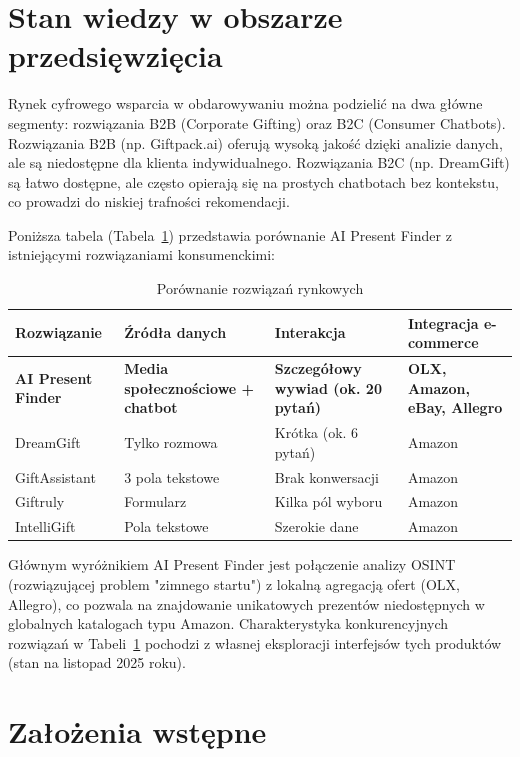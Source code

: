 \documentclass[12pt,a4paper]{article}
\begin{document}
\section{Stan wiedzy w obszarze przedsięwzięcia}

Rynek cyfrowego wsparcia w obdarowywaniu można podzielić na dwa główne segmenty: rozwiązania B2B (Corporate Gifting) oraz B2C (Consumer Chatbots). Rozwiązania B2B (np. Giftpack.ai) oferują wysoką jakość dzięki analizie danych, ale są niedostępne dla klienta indywidualnego. Rozwiązania B2C (np. DreamGift) są łatwo dostępne, ale często opierają się na prostych chatbotach bez kontekstu, co prowadzi do niskiej trafności rekomendacji.

Poniższa tabela (Tabela~\ref{tab:market-comparison}) przedstawia porównanie AI Present Finder z istniejącymi rozwiązaniami konsumenckimi:

\begin{table}[h]
\centering
\begin{tabular}{|p{}|p{}|p{}|p{}|}
\hline
\textbf{Rozwiązanie} & \textbf{Źródła danych} & \textbf{Interakcja} & \textbf{Integracja e-commerce} \\
\hline
\textbf{AI Present Finder} & \textbf{Media społecznościowe + chatbot} & \textbf{Szczegółowy wywiad (ok. 20 pytań)} & \textbf{OLX, Amazon, eBay, Allegro} \\
\hline
DreamGift & Tylko rozmowa & Krótka (ok. 6 pytań) & Amazon \\
\hline
GiftAssistant & 3 pola tekstowe & Brak konwersacji & Amazon \\
\hline
Giftruly & Formularz & Kilka pól wyboru & Amazon \\
\hline
IntelliGift & Pola tekstowe & Szerokie dane & Amazon \\
\hline
\end{tabular}
\caption{Porównanie rozwiązań rynkowych}
\label{tab:market-comparison}
\end{table}

Głównym wyróżnikiem AI Present Finder jest połączenie analizy OSINT (rozwiązującej problem "zimnego startu") z lokalną agregacją ofert (OLX, Allegro), co pozwala na znajdowanie unikatowych prezentów niedostępnych w globalnych katalogach typu Amazon. Charakterystyka konkurencyjnych rozwiązań w Tabeli~\ref{tab:market-comparison} pochodzi z własnej eksploracji interfejsów tych produktów (stan na listopad 2025 roku).

\section{Założenia wstępne}
\end{document}
